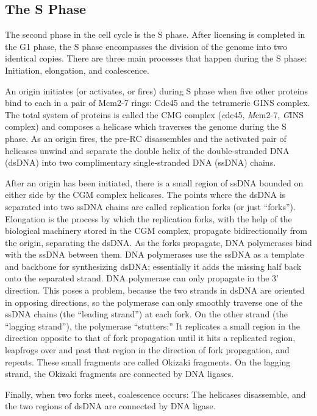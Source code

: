 		\subsection{The S Phase}
		
		The second phase in the cell cycle is the S phase.
		After licensing is completed in the G1 phase, the S phase encompasses the division of the genome into two identical copies.
		There are three main processes that happen during the S phase:
		Initiation, elongation, and coalescence.
		
		An origin initiates (or activates, or fires) during S phase when five other proteins bind to each in a pair of Mcm2-7 rings:
		Cdc45 and the tetrameric GINS complex.
		The total system of proteins is called the CMG complex (\emph{c}dc45, \emph{M}cm2-7, \emph{G}INS complex) and composes a helicase which traverses the genome during the S phase.
		As an origin fires, the pre-RC disassembles and the activated pair of helicases unwind and separate the double helix of the double-stranded DNA (dsDNA) into two complimentary single-stranded DNA (ssDNA) chains. \cite{GINSComplex}
		
		After an origin has been initiated, there is a small region of ssDNA bounded on either side by the CGM complex helicases.
		The points where the dsDNA is separated into two ssDNA chains are called replication forks (or just ``forks'').
		Elongation is the process by which the replication forks, with the help of the biological machinery stored in the CGM complex, propagate bidirectionally from the origin, separating the dsDNA.
		As the forks propagate, DNA polymerases bind with the ssDNA between them.
		DNA polymerases use the ssDNA as a template and backbone for synthesizing dsDNA; essentially it adds the missing half back onto the separated strand.
		DNA polymerase can only propagate in the 3' direction.
		This poses a problem, because the two strands in dsDNA are oriented in opposing directions, so the polymerase can only smoothly traverse one of the ssDNA chains (the ``leading strand'') at each fork.
		On the other strand (the ``lagging strand''), the polymerase ``stutters:''
		It replicates a small region in the direction opposite to that of fork propagation until it hits a replicated region, leapfrogs over and past that region in the direction of fork propagation, and repeats.
		These small fragments are called Okizaki fragments.
		On the lagging strand, the Okizaki fragments are connected by DNA ligases.
		
		Finally, when two forks meet, coalescence occurs:
		The helicases disassemble, and the two regions of dsDNA are connected by DNA ligase. \cite{MolecularCellBiology}
		
